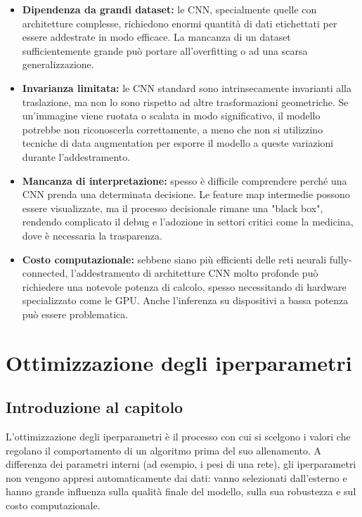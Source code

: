 \documentclass[a4paper,12pt]{report}
\begin{document}
	\begin{itemize}
		\item \textbf{Dipendenza da grandi dataset:} le CNN, specialmente quelle con architetture complesse, richiedono enormi quantità di dati etichettati per essere addestrate in modo efficace. La mancanza di un dataset sufficientemente grande può portare all'overfitting o ad una scarsa generalizzazione.
		\item \textbf{Invarianza limitata:} le CNN standard sono intrinsecamente invarianti alla traslazione, ma non lo sono rispetto ad altre trasformazioni geometriche. Se un'immagine viene ruotata o scalata in modo significativo, il modello potrebbe non riconoscerla correttamente, a meno che non si utilizzino tecniche di data augmentation per esporre il modello a queste variazioni durante l'addestramento.
		\item \textbf{Mancanza di interpretazione:} spesso è difficile comprendere perché una CNN prenda una determinata decisione. Le feature map intermedie possono essere visualizzate, ma il processo decisionale rimane una "black box", rendendo complicato il debug e l'adozione in settori critici come la medicina, dove è necessaria la trasparenza.
		\item \textbf{Costo computazionale:} sebbene siano più efficienti delle reti neurali fully-connected, l'addestramento di architetture CNN molto profonde può richiedere una notevole potenza di calcolo, spesso necessitando di hardware specializzato come le GPU. Anche l'inferenza su dispositivi a bassa potenza può essere problematica.
	\end{itemize}
	
	\chapter{Ottimizzazione degli iperparametri}
	
	\section{Introduzione al capitolo}
	L'ottimizzazione degli iperparametri è il processo con cui si scelgono i valori che regolano il comportamento di un algoritmo prima del suo allenamento. A differenza dei parametri interni (ad esempio, i pesi di una rete), gli iperparametri non vengono appresi automaticamente dai dati: vanno selezionati dall'esterno e hanno grande influenza sulla qualità finale del modello, sulla sua robustezza e sul costo computazionale.
	
\end{document}
